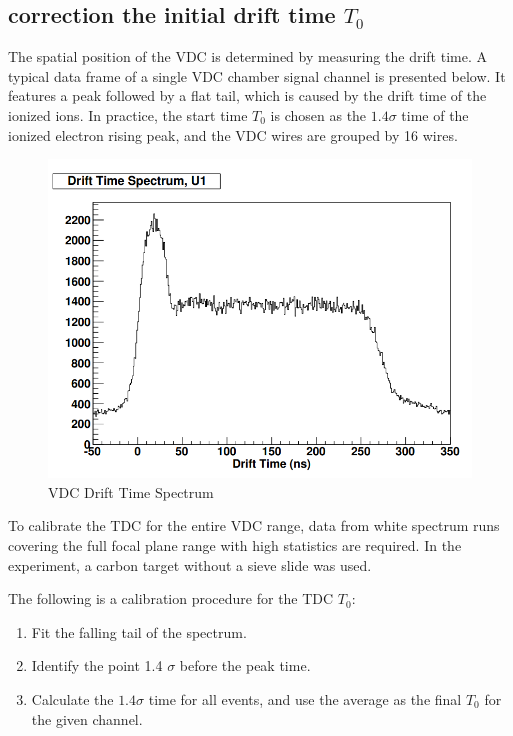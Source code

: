 \subsection{correction the initial drift time $T_0$}

The spatial position of the VDC is determined by measuring the drift time. A typical data frame of a single VDC chamber signal channel is presented below. It features a peak followed by a flat tail, which is caused by the drift time of the ionized ions. In practice, the start time $T_0$ is chosen as the $1.4\sigma$ time of the ionized electron rising peak, and the VDC wires are grouped by 16 wires.

\begin{figure}[!htbp]
\centering
\includegraphics[scale = 0.25]{images/chap4/vdc_signals.png}
\caption{VDC Drift Time Spectrum}
\label{fig:vdc_dift_time_spectrum}
\end{figure}

To calibrate the TDC for the entire VDC range, data from white spectrum runs covering the full focal plane range with high statistics are required. In the experiment, a carbon target without a sieve slide was used.

The following is a calibration procedure for the TDC $T_0$: 
\begin{enumerate}
\item Fit the falling tail of the spectrum.
\item Identify the point 1.4 $\sigma$ before the peak time.
\item Calculate the $1.4\sigma$ time for all events, and use the average as the final $T_0$ for the given channel.
\end{enumerate}

